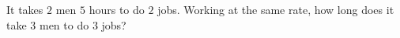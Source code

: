 It takes $2$ men $5$ hours to do $2$ jobs. Working at the same rate, how long does it take $3$ men to do $3$ jobs?
